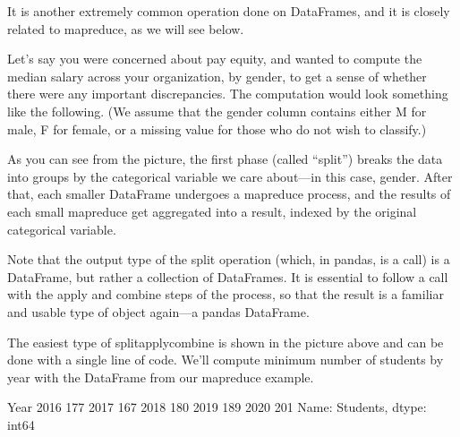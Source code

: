 \documentclass[letterpaper,10pt,english]{jupyterBook}
\begin{document}
\sphinxAtStartPar
It is another extremely common operation done on DataFrames, and it is closely related to map\sphinxhyphen{}reduce, as we will see below.

\sphinxAtStartPar
Let’s say you were concerned about pay equity, and wanted to compute the median salary across your organization, by gender, to get a sense of whether there were any important discrepancies.  The computation would look something like the following.  (We assume that the gender column contains either M for male, F for female, or a missing value for those who do not wish to classify.)

\sphinxAtStartPar
{}

\sphinxAtStartPar
As you can see from the picture, the first phase (called “split”) breaks the data into groups by the categorical variable we care about—in this case, gender.  After that, each smaller DataFrame undergoes a map\sphinxhyphen{}reduce process, and the results of each small map\sphinxhyphen{}reduce get aggregated into a result, indexed by the original categorical variable.

\sphinxAtStartPar
Note that the output type of the split operation (which, in pandas, is a  call) is  a DataFrame, but rather a collection of DataFrames.  It is essential to follow a  call with the apply and combine steps of the process, so that the result is a familiar and usable type of object again—a pandas DataFrame.

\sphinxAtStartPar
The easiest type of split\sphinxhyphen{}apply\sphinxhyphen{}combine is shown in the picture above and can be done with a single line of code.  We’ll compute minimum number of students by year with the DataFrame from our map\sphinxhyphen{}reduce example.

\begin{sphinxVerbatim}[commandchars=\\\{\}]
\PYG{p}{[}\PYG{p}{]}
\end{sphinxVerbatim}

\begin{sphinxVerbatim}[commandchars=\\\{\}]
Year
2016    177
2017    167
2018    180
2019    189
2020    201
Name: \PYGZsh{} Students, dtype: int64
\end{sphinxVerbatim}
\end{document}
